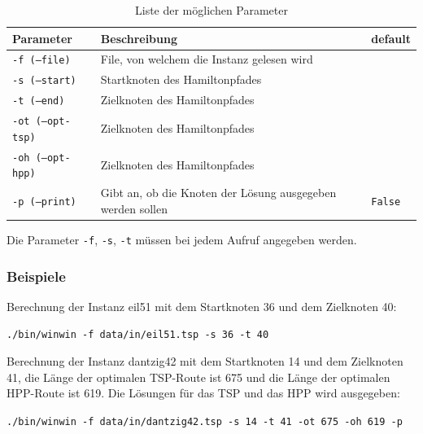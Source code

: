 \documentclass[11pt,a4paper]{article}
\begin{document}
\begin{table}[H]
        \centering
        \begin{tabular}{| l | l | l |}
            \hline
            \textbf{Parameter}          & \textbf{Beschreibung}                                         & \textbf{default}      \\ \hline
            \texttt{-f (--file)}        & File, von welchem die Instanz gelesen wird                    &                       \\ \hline
            \texttt{-s (--start)}       & Startknoten des Hamiltonpfades                                &                       \\ \hline
            \texttt{-t (--end)}         & Zielknoten des Hamiltonpfades                                 &                       \\ \hline
            \texttt{-ot (--opt-tsp)}    & Zielknoten des Hamiltonpfades                                 &                       \\ \hline
            \texttt{-oh (--opt-hpp)}    & Zielknoten des Hamiltonpfades                                 &                       \\ \hline
            \texttt{-p (--print)}       & Gibt an, ob die Knoten der Lösung ausgegeben werden sollen    & \texttt{False}        \\ \hline
        \end{tabular}
        \caption{Liste der möglichen Parameter}
        \label{tab:parameter}
\end{table}

Die Parameter \texttt{-f}, \texttt{-s}, \texttt{-t} müssen bei jedem Aufruf angegeben werden.

\subsubsection{Beispiele}
Berechnung der Instanz eil51 mit dem Startknoten 36 und dem Zielknoten 40:
\begin{flushleft}
\texttt{./bin/winwin -f data/in/eil51.tsp -s 36 -t 40}
\end{flushleft}

Berechnung der Instanz dantzig42 mit dem Startknoten 14 und dem Zielknoten 41, die Länge der optimalen TSP-Route ist 675 und die Länge der optimalen HPP-Route ist 619. Die Lösungen für das TSP und das HPP wird ausgegeben:
\begin{flushleft}
\texttt{./bin/winwin -f data/in/dantzig42.tsp -s 14 -t 41 -ot 675 -oh 619 -p}
\end{flushleft}
\end{document}

